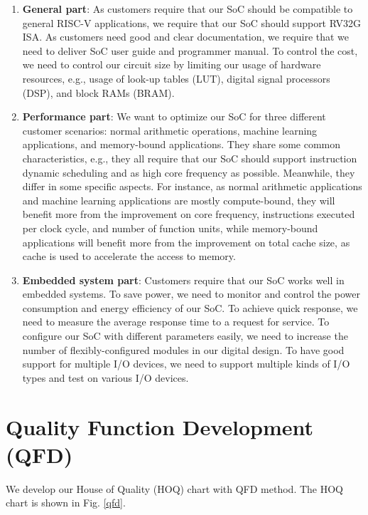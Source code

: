 \begin{enumerate}
    \item \textbf{General part}: As customers require that our SoC should be compatible to general RISC-V applications, we require that our SoC should support RV32G ISA. As customers need good and clear documentation, we require that we need to deliver SoC user guide and programmer manual. To control the cost, we need to control our circuit size by limiting our usage of hardware resources, e.g., usage of look-up tables (LUT), digital signal processors (DSP), and block RAMs (BRAM).
    \item \textbf{Performance part}: We want to optimize our SoC for three different customer scenarios: normal arithmetic operations, machine learning applications, and memory-bound applications. They share some common characteristics, e.g., they all require that our SoC should support instruction dynamic scheduling and as high core frequency as possible. Meanwhile, they differ in some specific aspects. For instance, as normal arithmetic applications and machine learning applications are mostly compute-bound, they will benefit more from the improvement on core frequency, instructions executed per clock cycle, and number of function units, while memory-bound applications will benefit more from the improvement on total cache size, as cache is used to accelerate the access to memory.
    \item \textbf{Embedded system part}: Customers require that our SoC works well in embedded systems. To save power, we need to monitor and control the power consumption and energy efficiency of our SoC. To achieve quick response, we need to measure the average response time to a request for service. To configure our SoC with different parameters easily, we need to increase the number of flexibly-configured modules in our digital design. To have good support for multiple I/O devices, we need to support multiple kinds of I/O types and test on various I/O devices.
\end{enumerate}

\section{Quality Function Development (QFD)}
We develop our House of Quality (HOQ) chart with QFD method. The HOQ chart is shown in Fig. \ref{qfd}.

